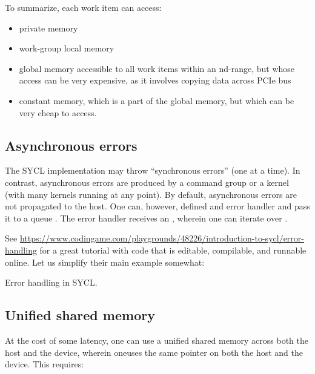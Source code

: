 To summarize, each work item can access:
\begin{itemize}
\item private memory
\item work-group local memory
\item global memory accessible to all work items within an nd-range, but whose access can be very expensive, as it involves copying data across PCIe bus
\item constant memory, which is a part of the global memory, but which can be very cheap to access. 
\end{itemize}

\subsection{Asynchronous errors}

The SYCL implementation may throw ``synchronous errors'' (one at a time).
In contrast, asynchronous errors are produced by a command group or a kernel (with many kernels running at any point). By default, asynchronous errors are not propagated to the host. One can, however, defined and error handler and pass it to a queue .
The error handler receives an , wherein one can iterate over .

See \url{https://www.codingame.com/playgrounds/48226/introduction-to-sycl/error-handling} for a great tutorial with code that is editable, compilable, and runnable online. Let us simplify their main example somewhat:

\raggedbottom
\begin{codebox}[]{\href{https://godbolt.org/z/h3aodW99P}{\ExternalLink}}
\footnotesize Error handling in SYCL.
\tcblower
{}
\end{codebox}
  
\subsection{Unified shared memory}
 
At the cost of some latency, one can use a unified shared memory across both the host and the device, wherein oneuses the same pointer on both the host and the device. This requires:
 

